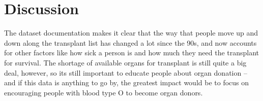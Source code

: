 \documentclass[
]{article}
\begin{document}
\hypertarget{discussion}{%
\section{\texorpdfstring{\textbf{Discussion}}{Discussion}}\label{discussion}}

The dataset documentation makes it clear that the way that people move
up and down along the transplant list has changed a lot since the 90s,
and now accounts for other factors like how sick a person is and how
much they need the transplant for survival. The shortage of available
organs for transplant is still quite a big deal, however, so
it\textquotesingle s still important to educate people about organ
donation -- and if this data is anything to go by, the greatest impact
would be to focus on encouraging people with blood type O to become
organ donors.
\end{document}
